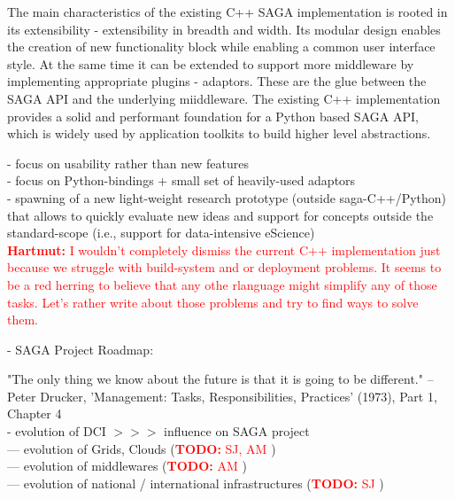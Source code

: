 \documentclass{article}
\newcommand{\B}[1]{\textbf{#1}}
\newcommand{\nind}{\noindent}
\newcommand{\todo}[1]{{\textcolor{red}{\B{TODO:} #1 }}}
\newcommand{\hknote}[1]{{\textcolor{red}{  \B{Hartmut: } #1 }}}
\newcommand{\hknote}[1]{}
\begin{document}
The main characteristics of the existing C++ SAGA implementation is rooted in its
extensibility - extensibility in breadth and width. Its modular design enables the
creation of new functionality block while enabling a common user interface style.
At the same time it can be extended to support more middleware by implementing
appropriate plugins - adaptors. These are the glue between the SAGA API and 
the underlying miiddleware. The existing C++ implementation provides a solid 
and performant foundation for a Python based SAGA API, which is widely used 
by application toolkits to build higher level abstractions.


 - focus on usability rather than new features\\
 - focus on Python-bindings + small set of heavily-used adaptors\\
 - spawning of a new light-weight research prototype (outside saga-C++/Python) that allows to quickly evaluate new ideas and support for concepts outside the standard-scope (i.e., support for data-intensive eScience)\\

\hknote{I wouldn't completely dismiss the current C++ implementation just because
  we struggle with build-system and or deployment problems. It seems to be a 
  red herring to believe that any othe rlanguage might simplify any of those 
  tasks. Let's rather write about those problems and try to find ways to solve them.}


 \nind
 - SAGA Project Roadmap:\\

 
 \nind

 "The only thing we know about the future is that it is going to be
 different." -- Peter Drucker, 'Management: Tasks,
 Responsibilities, Practices' (1973), Part 1, Chapter 4\\ 


 - evolution of DCI $>>>$ influence on SAGA project\\
 --- evolution of Grids, Clouds (\todo{SJ, AM})\\
 --- evolution of middlewares (\todo{AM})\\
 --- evolution of national / international infrastructures (\todo{SJ})\\
\end{document}
